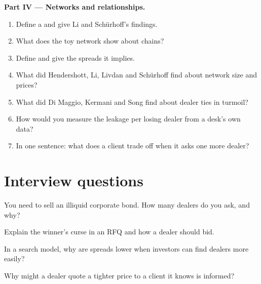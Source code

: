\begin{problem}
\medskip\noindent\textbf{Part IV --- Networks and relationships.}
\begin{enumerate}[resume]
\item Define a  and give Li and Schürhoff's findings.
\item What does the toy network show about chains?
\item Define  and give the spreads it implies.
\item What did Hendershott, Li, Livdan and Schürhoff find about network size and prices?
\item What did Di Maggio, Kermani and Song find about dealer ties in turmoil?
\item How would you measure the leakage per losing dealer from a desk's own data?
\item In one sentence: what does a client trade off when it asks one more dealer?
\end{enumerate}
\end{problem}

\section{Interview questions}

\begin{interviewq}\label{iq:mx:request-for-quote-and-dealer-markets-in-theory:1}
You need to sell an illiquid corporate bond. How many dealers do you ask, and why?
\end{interviewq}

\begin{interviewq}\label{iq:mx:request-for-quote-and-dealer-markets-in-theory:2}
Explain the winner's curse in an RFQ and how a dealer should bid.
\end{interviewq}

\begin{interviewq}\label{iq:mx:request-for-quote-and-dealer-markets-in-theory:3}
In a search model, why are spreads lower when investors can find dealers more easily?
\end{interviewq}

\begin{interviewq}\label{iq:mx:request-for-quote-and-dealer-markets-in-theory:4}
Why might a dealer quote a tighter price to a client it knows is informed?
\end{interviewq}

